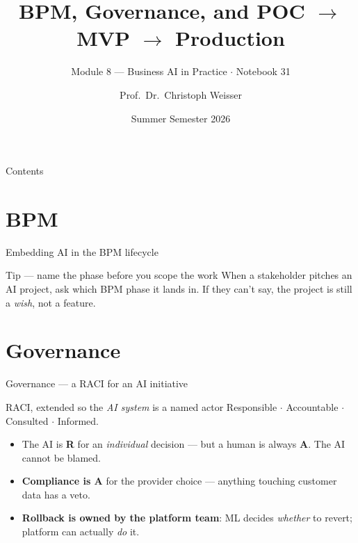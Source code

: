 \documentclass[aspectratio=169,11pt]{beamer}
\title{BPM, Governance, and POC $\to$ MVP $\to$ Production}
\subtitle{Module 8 --- Business AI in Practice $\cdot$ Notebook 31}
\author{Prof.\ Dr.\ Christoph Weisser}
\institute{HSBI}
\date{Summer Semester 2026}
\begin{document}
\begin{frame}\titlepage\end{frame}

\begin{frame}{Contents}
  \tableofcontents[hideallsubsections]
\end{frame}

\section{BPM}
\begin{frame}{Embedding AI in the BPM lifecycle}
  \begin{center}
  \end{center}
  \begin{exampleblock}{Tip --- name the phase before you scope the work}
    When a stakeholder pitches an AI project, ask which BPM phase it lands in. If they can't say, the project is still a \emph{wish}, not a feature.
  \end{exampleblock}
\end{frame}

\section{Governance}
\begin{frame}{Governance --- a RACI for an AI initiative}
  \begin{block}{RACI, extended so the \emph{AI system} is a named actor}
    Responsible $\cdot$ Accountable $\cdot$ Consulted $\cdot$ Informed.
  \end{block}
  \begin{itemize}
    \item The AI is \textbf{R} for an \emph{individual} decision --- but a human is always \textbf{A}. The AI cannot be blamed.
    \item \textbf{Compliance is A} for the provider choice --- anything touching customer data has a veto.
    \item \textbf{Rollback is owned by the platform team}: ML decides \emph{whether} to revert; platform can actually \emph{do} it.
  \end{itemize}
\end{frame}
\end{document}
